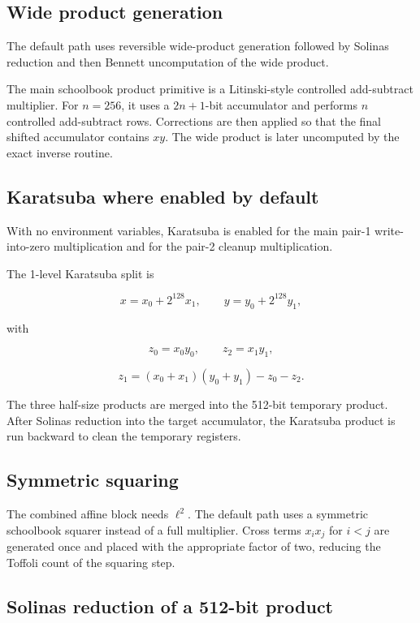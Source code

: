\documentclass[11pt]{article}
\newcommand{\ellv}{\ell}
\begin{document}
\subsection{Wide product generation}

The default path uses reversible wide-product generation followed by Solinas
reduction and then Bennett uncomputation of the wide product.

The main schoolbook product primitive is a Litinski-style controlled
add-subtract multiplier.  For \(n=256\), it uses a \(2n+1\)-bit accumulator and
performs \(n\) controlled add-subtract rows.  Corrections are then applied so
that the final shifted accumulator contains \(xy\).  The wide product is later
uncomputed by the exact inverse routine.

\subsection{Karatsuba where enabled by default}

With no environment variables, Karatsuba is enabled for the main pair-1
write-into-zero multiplication and for the pair-2 cleanup multiplication.

The 1-level Karatsuba split is

\[
x=x_0+2^{128}x_1,
\qquad
 y=y_0+2^{128}y_1,
\]

with

\[
z_0=x_0y_0,
\qquad
z_2=x_1y_1,
\]

\[
z_1=(x_0+x_1)(y_0+y_1)-z_0-z_2.
\]

The three half-size products are merged into the 512-bit temporary product.
After Solinas reduction into the target accumulator, the Karatsuba product is
run backward to clean the temporary registers.

\subsection{Symmetric squaring}

The combined affine block needs \(\ellv^2\).  The default path uses a symmetric
schoolbook squarer instead of a full multiplier.  Cross terms \(x_i x_j\) for
\(i<j\) are generated once and placed with the appropriate factor of two,
reducing the Toffoli count of the squaring step.

\subsection{Solinas reduction of a 512-bit product}
\end{document}
